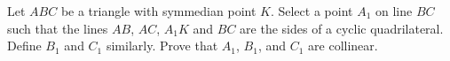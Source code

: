Let $ABC$ be a triangle with symmedian point $K$. Select a point $A_1$ on line $BC$ such that the lines $AB$, $AC$, $A_1K$ and $BC$ are the sides of a cyclic quadrilateral.  Define $B_1$ and $C_1$ similarly.  Prove that $A_1$, $B_1$, and $C_1$ are collinear.


